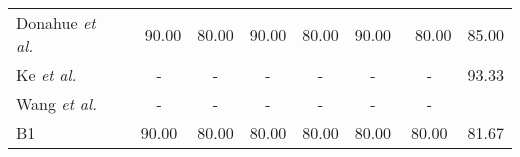 \documentclass[9pt,journal,letterpaper,twocolumn]{IEEEtran}
\begin{document}
\begin{table}[!t]
{\begin{center}
\begin{tabular}{lc cc cccc}
					\hspace{-0.5em}Donahue {\em et al.}~\cite{donahue2015long} & \hspace{-0.5em}~90.00\hspace{-0.5em}& \hspace{-0.5em}80.00\hspace{-0.5em} &\hspace{-0.5em}90.00\hspace{-0.5em}	& \hspace{-0.5em}80.00\hspace{-0.5em} & \hspace{-0.5em}90.00\hspace{-0.5em}	& \hspace{-0.5em}~80.00\hspace{-0.5em}&  \hspace{-0.5em}85.00\hspace{-0.5em} \\
					\hspace{-0.5em}Ke {\em et al.}~\cite{ke2016spatial}  &	-&	-&	-&	-&	-&	- & 93.33\\
					\hspace{-0.5em}Wang {\em et al.}~\cite{wang2015hierarchical}  &	-&	-&	-&	-&	-&	- & \hspace{-0.5em}{95.00}\hspace{-0.5em} \\
					\hline
					\hspace{-0.5em}B1  & \hspace{-0.5em}90.00\hspace{-0.5em} & \hspace{-0.5em}80.00\hspace{-0.5em} & \hspace{-0.5em}80.00\hspace{-0.5em} & \hspace{-0.5em}80.00\hspace{-0.5em} & \hspace{-0.5em}80.00\hspace{-0.5em} & \hspace{-0.5em}80.00\hspace{-0.5em} & \hspace{-0.5em}81.67\hspace{-0.5em}   \\

\end{tabular}
\end{center}}
\end{table}
\end{document}
